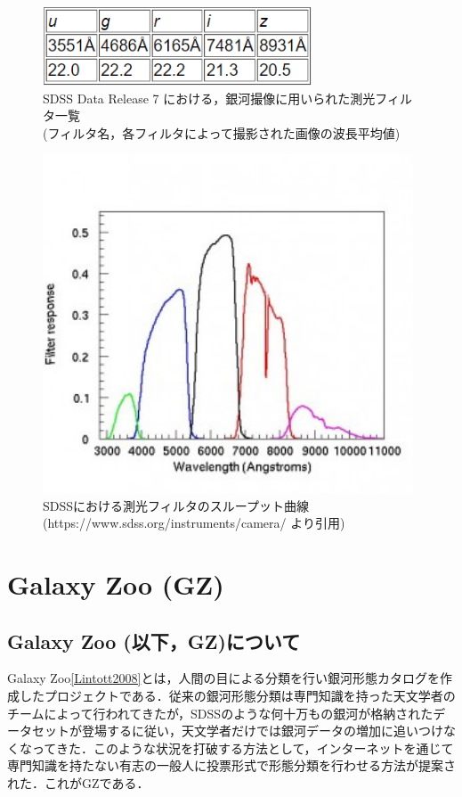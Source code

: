 \documentclass[a4j, 11pt]{jreport}
\begin{document}
\begin{figure}[H]
	\centering
	\includegraphics[width=8cm]{images/dr7_filters.png}
	\caption{SDSS Data Release 7 における，銀河撮像に用いられた測光フィルタ一覧\\(フィルタ名，各フィルタによって撮影された画像の波長平均値)}
	\label{fig:dr7_filters}
\end{figure}

\begin{figure}[H]
 \centering
 \includegraphics[width=11cm]{images/camera_filters-300x274.png}
 \caption{SDSSにおける測光フィルタのスループット曲線\\(https://www.sdss.org/instruments/camera/ より引用)}
 \label{fig:filter_responces}
\end{figure}



\section{Galaxy Zoo (GZ)}
\subsection*{Galaxy Zoo (以下，GZ)について}
Galaxy Zoo\ref{Lintott2008}とは，人間の目による分類を行い銀河形態カタログを作成したプロジェクトである．従来の銀河形態分類は専門知識を持った天文学者のチームによって行われてきたが，SDSSのような何十万もの銀河が格納されたデータセットが登場するに従い，天文学者だけでは銀河データの増加に追いつけなくなってきた．このような状況を打破する方法として，インターネットを通じて専門知識を持たない有志の一般人に投票形式で形態分類を行わせる方法が提案された．これがGZである．
\end{document}
